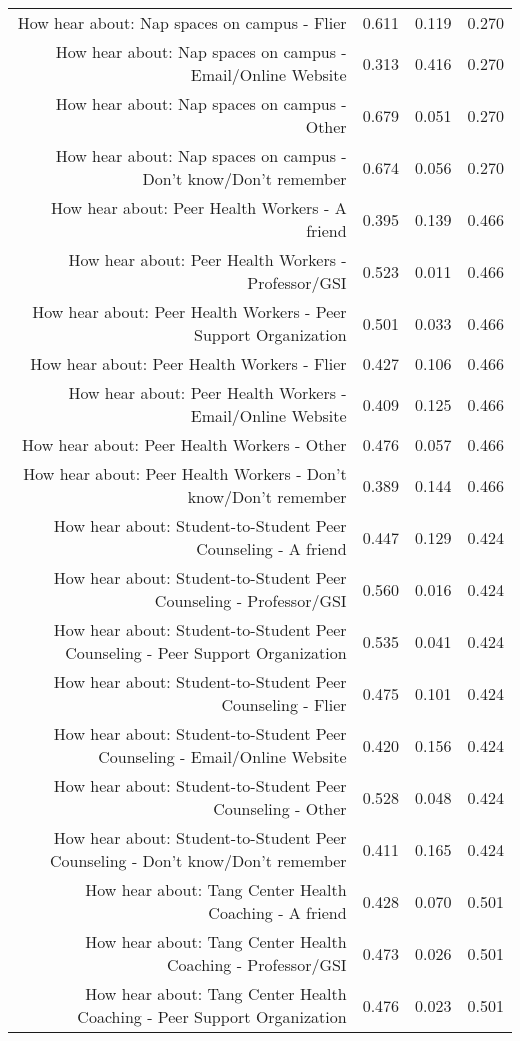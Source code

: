 \documentclass{article}\usepackage[]{graphicx}\usepackage[]{color}
\begin{document}
\begin{table}[ht]
\begin{tabular}{rrrr}
  How hear about: Nap spaces on campus - Flier & 0.611 & 0.119 & 0.270 \\ 
  How hear about: Nap spaces on campus - Email/Online Website & 0.313 & 0.416 & 0.270 \\ 
  How hear about: Nap spaces on campus - Other & 0.679 & 0.051 & 0.270 \\ 
  How hear about: Nap spaces on campus - Don't know/Don't remember & 0.674 & 0.056 & 0.270 \\ 
  How hear about: Peer Health Workers - A friend & 0.395 & 0.139 & 0.466 \\ 
  How hear about: Peer Health Workers - Professor/GSI & 0.523 & 0.011 & 0.466 \\ 
  How hear about: Peer Health Workers - Peer Support Organization & 0.501 & 0.033 & 0.466 \\ 
  How hear about: Peer Health Workers - Flier & 0.427 & 0.106 & 0.466 \\ 
  How hear about: Peer Health Workers - Email/Online Website & 0.409 & 0.125 & 0.466 \\ 
  How hear about: Peer Health Workers - Other & 0.476 & 0.057 & 0.466 \\ 
  How hear about: Peer Health Workers - Don't know/Don't remember & 0.389 & 0.144 & 0.466 \\ 
  How hear about: Student-to-Student Peer Counseling - A friend & 0.447 & 0.129 & 0.424 \\ 
  How hear about: Student-to-Student Peer Counseling - Professor/GSI & 0.560 & 0.016 & 0.424 \\ 
  How hear about: Student-to-Student Peer Counseling - Peer Support Organization & 0.535 & 0.041 & 0.424 \\ 
  How hear about: Student-to-Student Peer Counseling - Flier & 0.475 & 0.101 & 0.424 \\ 
  How hear about: Student-to-Student Peer Counseling - Email/Online Website & 0.420 & 0.156 & 0.424 \\ 
  How hear about: Student-to-Student Peer Counseling - Other & 0.528 & 0.048 & 0.424 \\ 
  How hear about: Student-to-Student Peer Counseling - Don't know/Don't remember & 0.411 & 0.165 & 0.424 \\ 
  How hear about: Tang Center Health Coaching - A friend & 0.428 & 0.070 & 0.501 \\ 
  How hear about: Tang Center Health Coaching - Professor/GSI & 0.473 & 0.026 & 0.501 \\ 
  How hear about: Tang Center Health Coaching - Peer Support Organization & 0.476 & 0.023 & 0.501 \\ 

\end{tabular}
\end{table}
\end{document}
